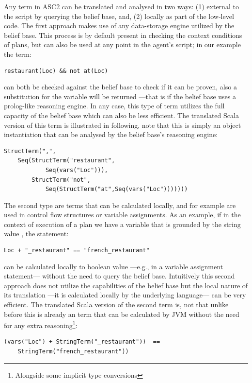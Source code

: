 Any term in ASC2 can be translated and analysed in two ways: (1) external to the script by querying the belief base, and, (2) locally as part of the low-level code. The first approach makes use of any data-storage engine utilized by the belief base. This process is by default present in checking the context conditions of plans, but can also be used at any point in the agent's script; in our example the term:
\begin{verbatim}
restaurant(Loc) && not at(Loc)
\end{verbatim}

\noindent can both be checked against the belief base to check if it can be proven, also a substitution for the variable  will be returned ---that is if the belief base uses a prolog-like reasoning engine. In any case, this type of term utilizes the full capacity of the belief base which can also be less efficient. The translated Scala version of this term is illustrated in following, note that this is simply an object instantiation that can be analysed by the belief base's reasoning engine:
\begin{verbatim}
StructTerm(",",
    Seq(StructTerm("restaurant",
            Seq(vars("Loc"))),
        StructTerm("not",
            Seq(StructTerm("at",Seq(vars("Loc")))))))
\end{verbatim}

The second type are terms that can be calculated locally, and for example are used in control flow structures  or variable assignments. As an example, if in the context of execution of a plan we have a variable  that is grounded by the string value , the statement:
\begin{verbatim}
Loc + "_restaurant" == "french_restaurant"
\end{verbatim}
\noindent can be calculated locally to boolean value  ---e.g., in a variable assignment statement--- without the need to query the belief base. Intuitively this second approach does not utilize the capabilities of the belief base but the local nature of its translation ---it is calculated locally by the underlying language--- can be very efficient. The translated Scala version of the second term is, not that unlike before this is already an term that can be calculated by JVM without the need for any extra reasoning\footnote{Alongside some implicit type conversions}:
\begin{verbatim}
(vars("Loc") + StringTerm("_restaurant"))  ==
    StringTerm("french_restaurant"))
\end{verbatim}


